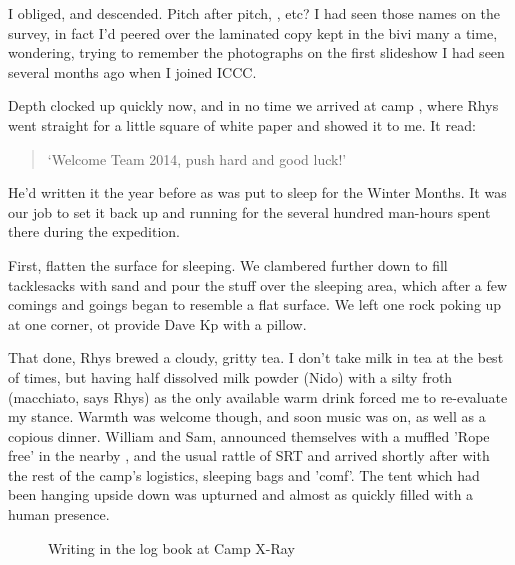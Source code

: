 I obliged, and descended. Pitch after pitch, ,  etc? I had seen those names on the survey, in fact I'd peered over the laminated copy kept in the bivi many a time, wondering, trying to remember the photographs on the first slideshow I had seen several months ago when I joined ICCC.




Depth clocked up quickly now, and in no time we arrived at camp , where Rhys went straight for a little square of white paper and showed it to me. It read:

\begin{quote}
`Welcome Team 2014, push hard and good luck!'
\end{quote}

He'd written it the year before as  was put to sleep for the Winter Months. It was our job to set it back up and running for the several hundred man-hours spent there during the expedition. 

First, flatten the surface for sleeping. We clambered further down  to fill tacklesacks with sand and pour the stuff over the sleeping area, which after a few comings and goings began to  resemble a flat surface. We left one rock poking up at one corner, ot provide Dave Kp with a pillow. 

That done, Rhys brewed a cloudy, gritty tea. I don't take milk in tea at the best of times, but having half dissolved milk powder (Nido) with a silty froth (macchiato, says Rhys) as the only available warm drink forced me to re-evaluate my stance. Warmth was welcome though, and soon music was on, as well as a copious dinner. William and Sam, announced themselves with a muffled 'Rope free' in the nearby , and the usual rattle of SRT and arrived shortly after with the rest of the camp's logistics, sleeping bags and 'comf'. The tent which had been hanging upside down was upturned and almost as quickly filled with a human presence. 

\begin{figure}[t]
\checkoddpage \ifoddpage \forcerectofloat \else \forceversofloat \fi
\centering
{}
\caption{Writing in the log book at Camp X-Ray }
\label{Camp X-Ray}
\end{figure}



